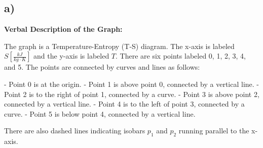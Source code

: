 

\subsection*{a)}

\begin{center}
\textbf{Verbal Description of the Graph:}

The graph is a Temperature-Entropy (T-S) diagram. The x-axis is labeled \( S \left[ \frac{kJ}{kg \cdot K} \right] \) and the y-axis is labeled \( T \). There are six points labeled 0, 1, 2, 3, 4, and 5. The points are connected by curves and lines as follows:

- Point 0 is at the origin.
- Point 1 is above point 0, connected by a vertical line.
- Point 2 is to the right of point 1, connected by a curve.
- Point 3 is above point 2, connected by a vertical line.
- Point 4 is to the left of point 3, connected by a curve.
- Point 5 is below point 4, connected by a vertical line.

There are also dashed lines indicating isobars \( p_1 \) and \( p_2 \) running parallel to the x-axis.

\end{center}